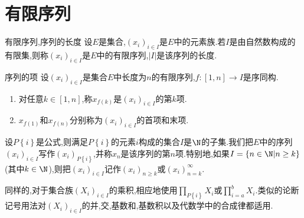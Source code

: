 \section{有限序列}

\begin{definition}{有限序列,序列的长度}{}
	设$E$是集合,$\left(x_{i}\right)_{i\in I}$是$E$中的元素族.若$I$是由自然数构成的有限集,则称$\left(x_{i}\right)_{i\in I}$是$E$中的有限序列,$\left|I\right|$是该序列的长度.
\end{definition}

\begin{definition}{序列的项}{}
	设$\left(x_{i}\right)_{i\in I}$是集合$E$中长度为$n$的有限序列,$f:\left[1,n\right]\to I$是序同构.
	\begin{enumerate}
		\item 对任意$k\in\left[1,n\right]$,称$x_{f\left(k\right)}$是$\left(x_{i}\right)_{i\in I}$的第$k$项.
		\item $x_{f\left(1\right)}$和$x_{f\left(n\right)}$分别称为$\left(x_{i}\right)_{i\in I}$的首项和末项.
	\end{enumerate}
\end{definition}

\begin{convention}{}{}
	设$P\left\{i\right\}$是公式,则满足$P\left\{i\right\}$的元素$i$构成的集合$I$是$\N$的子集.我们把$E$中的序列$\left(x_{i}\right)_{i\in I}$写作$\left(x_{i}\right)_{P\left\{i\right\}}$,并称$x_{n}$是该序列的第$n$项.特别地,如果$I=\left\{n\in\N\middle|n\geq k\right\}$(其中$k\in\N$),则把$\left(x_{i}\right)_{i\in I}$记作$\left(x_{i}\right)_{n\geq k}$或$\left(x_{i}\right)_{n=k}^{\infty}$.
	
	同样的,对于集合族$\left(X_{i}\right)_{i\in I}$的乘积,相应地使用$\prod\limits_{P\left\{i\right\}}X_{i}$或$\prod\limits_{i=a}^{b}X_{i}$.类似的论断记号用法对$\left(X_{i}\right)_{i\in I}$的并,交,基数和,基数积以及代数学中的合成律都适用.
\end{convention}
























